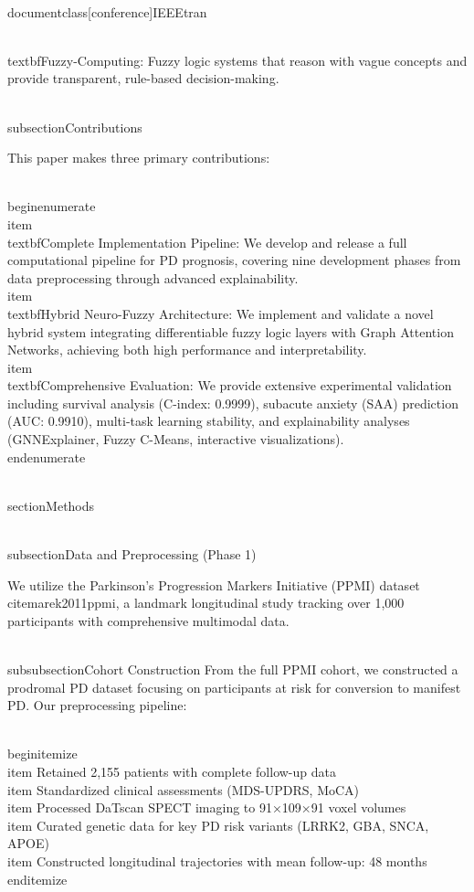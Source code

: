 \\documentclass[conference]{IEEEtran}
\begin{document}
\\textbf{Fuzzy-Computing:} Fuzzy logic systems that reason with vague concepts and provide transparent, rule-based decision-making.

\\subsection{Contributions}

This paper makes three primary contributions:

\\begin{enumerate}
    \\item \\textbf{Complete Implementation Pipeline:} We develop and release a full computational pipeline for PD prognosis, covering nine development phases from data preprocessing through advanced explainability.
    \\item \\textbf{Hybrid Neuro-Fuzzy Architecture:} We implement and validate a novel hybrid system integrating differentiable fuzzy logic layers with Graph Attention Networks, achieving both high performance and interpretability.
    \\item \\textbf{Comprehensive Evaluation:} We provide extensive experimental validation including survival analysis (C-index: 0.9999), subacute anxiety (SAA) prediction (AUC: 0.9910), multi-task learning stability, and explainability analyses (GNNExplainer, Fuzzy C-Means, interactive visualizations).
\\end{enumerate}

\\section{Methods}

\\subsection{Data and Preprocessing (Phase 1)}

We utilize the Parkinson's Progression Markers Initiative (PPMI) dataset \\cite{marek2011ppmi}, a landmark longitudinal study tracking over 1,000 participants with comprehensive multimodal data.

\\subsubsection{Cohort Construction}
From the full PPMI cohort, we constructed a prodromal PD dataset focusing on participants at risk for conversion to manifest PD. Our preprocessing pipeline:

\\begin{itemize}
    \\item Retained 2,155 patients with complete follow-up data
    \\item Standardized clinical assessments (MDS-UPDRS, MoCA)
    \\item Processed DaTscan SPECT imaging to 91×109×91 voxel volumes
    \\item Curated genetic data for key PD risk variants (LRRK2, GBA, SNCA, APOE)
    \\item Constructed longitudinal trajectories with mean follow-up: 48 months
\\end{itemize}
\end{document}

